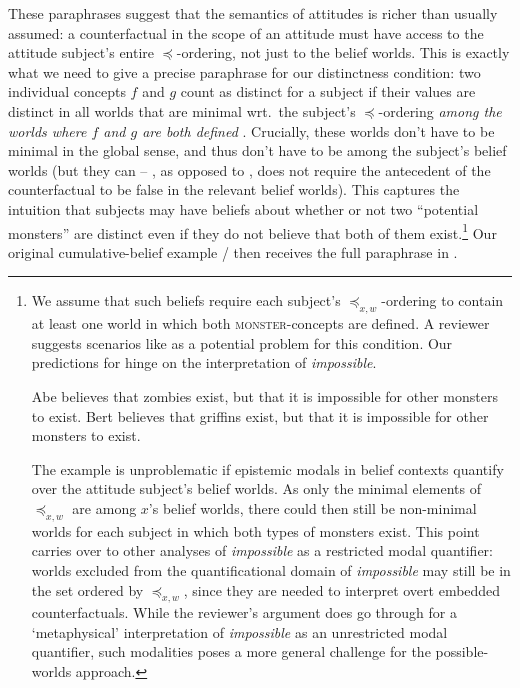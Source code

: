 \documentclass[output=paper]{langscibook}
\begin{document}
\noindent These paraphrases suggest that the semantics of attitudes is richer than usually assumed: a counterfactual in the scope of an attitude must have access to the attitude subject's entire $\preceq$-ordering, not just to the belief worlds. This is exactly what we need to give a precise paraphrase for our distinctness condition: two individual concepts $f$ and $g$ count as distinct for a subject if their values are distinct in all worlds that are minimal wrt.~the subject's $\preceq$-ordering \textit{among the worlds where $f$ and $g$ are both defined} . Crucially, these worlds don't have to be minimal in the global sense, and thus don't have to be among the subject's belief worlds (but they can --  , as opposed to  , does not require the antecedent of the counterfactual to be false in the relevant belief worlds). This captures the intuition that subjects may have beliefs about whether or not two ``potential monsters'' are distinct even if they do not believe that both of them exist.\footnote{We assume that such beliefs require each subject's $\preceq_{x, w}$-ordering to contain at least one world in which both \textsc{monster}-concepts are defined. A reviewer suggests scenarios like  as a potential problem for this condition. Our predictions for  hinge on the interpretation of \textit{impossible}.

\eanoraggedright\label{sch-has:ex:rev1} Abe believes that zombies exist, but that it is impossible for other monsters to exist. Bert believes that griffins exist, but that it is impossible for other monsters to exist.\z

\noindent The example is unproblematic if epistemic modals in  belief contexts quantify over the attitude subject's belief worlds. As only the minimal elements of $\preceq_{x, w}$ are among $x$'s belief worlds, there could then still be non-minimal worlds for each subject in which both types of monsters exist. This point carries over to other analyses of \textit{impossible} as a restricted modal quantifier: worlds excluded from the quantificational domain of \textit{impossible} may still be in the set ordered by $\preceq_{x, w}$, since they are needed to interpret overt embedded counterfactuals. While the reviewer's argument does go through for a `metaphysical' interpretation of \textit{impossible} as an unrestricted modal quantifier, such modalities poses a more general challenge for the possible-worlds approach.} Our original cumulative-belief example / then receives the full paraphrase in .
\end{document}
